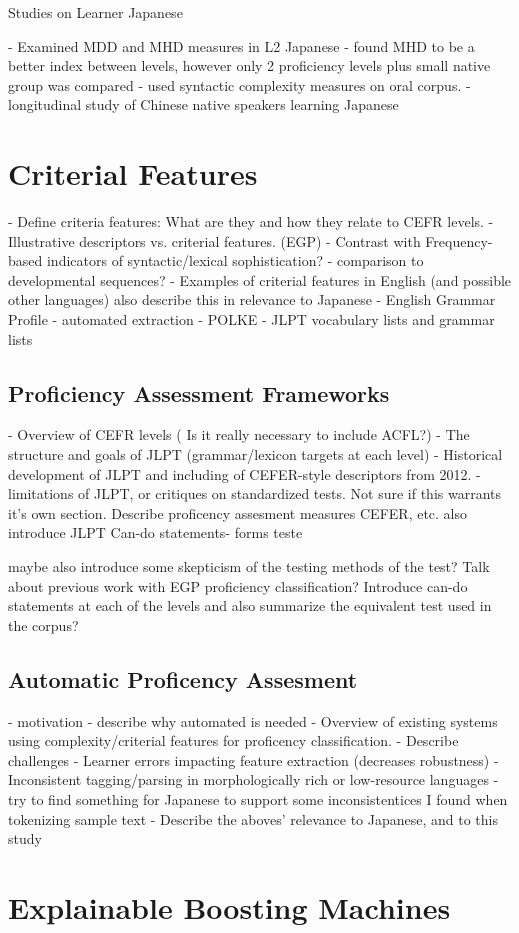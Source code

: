 Studies on Learner Japanese


\citet{komori2019} - Examined MDD and MHD measures in L2 Japanese - found MHD to be a better index between levels,
however only 2 proficiency levels plus small native group was compared
\citet{Iwashita2006} - used syntactic complexity measures on oral corpus.
\citet{Yang2023} - longitudinal study of Chinese native speakers learning Japanese

\section{Criterial Features}
- Define criteria features: What are they and how they relate to CEFR levels.
- Illustrative descriptors vs. criterial features. (EGP)
- Contrast with Frequency-based indicators of syntactic/lexical sophistication? \cite{Ellis2004}
    - comparison to developmental sequences?
- Examples of criterial features in English (and possible other languages) also describe this in relevance to Japanese
    - English Grammar Profile
- automated extraction - POLKE
- JLPT vocabulary lists and grammar lists


\subsection{Proficiency Assessment Frameworks}
- Overview of CEFR levels ( Is it really necessary to include ACFL?)
- The structure and goals of JLPT (grammar/lexicon targets at each level)
- Historical development of JLPT and including of CEFER-style descriptors from 2012.
- limitations of JLPT, or critiques on standardized tests.
Not sure if this warrants it's own section. Describe proficency assesment measures CEFER, etc. also introduce JLPT
Can-do statements- forms teste


maybe also introduce some skepticism of the testing methods of the test?
Talk about previous work with EGP proficiency classification?
Introduce can-do statements at each of the levels and also summarize the equivalent test used in the corpus?


\subsection{Automatic Proficency Assesment}
- motivation - describe why automated is needed
- Overview of existing systems using complexity/criterial features for proficency classification.
- Describe challenges
    - Learner errors impacting feature extraction (decreases robustness)
    -Inconsistent tagging/parsing in morphologically rich or low-resource languages
        -try to find something for Japanese to support some inconsistentices I found when tokenizing sample text
- Describe the aboves' relevance to Japanese, and to this study

\section{Explainable Boosting Machines}

